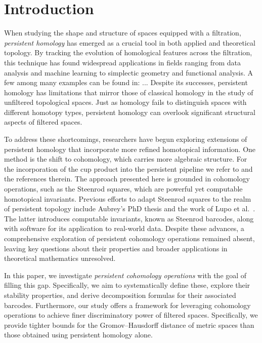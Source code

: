 
\section{Introduction} \label{s:introduction}

When studying the shape and structure of spaces equipped with a filtration, \textit{persistent homology} has emerged as a crucial tool in both applied and theoretical topology.
By tracking the evolution of homological features across the filtration, this technique has found widespread applications in fields ranging from data analysis and machine learning to simplectic geometry and functional analysis.
A few among many examples can be found in: ...
Despite its successes, persistent homology has limitations that mirror those of classical homology in the study of unfiltered topological spaces.
Just as homology fails to distinguish spaces with different homotopy types, persistent homology can overlook significant structural aspects of filtered spaces.

To address these shortcomings, researchers have begun exploring extensions of persistent homology that incorporate more refined homotopical information. One method is the shift to cohomology, which carries more algebraic structure.
For the incorporation of the cup product into the persistent pipeline we refer to \cite{memoli2024persistent} and the references therein.
The approach presented here is grounded in cohomology operations, such as the Steenrod squares, which are powerful yet computable homotopical invariants.
Previous efforts to adapt Steenrod squares to the realm of persistent topology include Aubrey's PhD thesis \cite{aubrey2011thesis} and the work of Lupo et al.\ \cite{medina2022per_st}.
The latter introduces computable invariants, known as Steenrod barcodes, along with software for its application to real-world data.
Despite these advances, a comprehensive exploration of persistent cohomology operations remained absent, leaving key questions about their properties and broader applications in theoretical mathematics unresolved.

In this paper, we investigate \textit{persistent cohomology operations} with the goal of filling this gap.
Specifically, we aim to systematically define these, explore their stability properties, and derive decomposition formulas for their associated barcodes.
Furthermore, our study offers a framework for leveraging cohomology operations to achieve finer discriminatory power of filtered spaces.
Specifically, we provide tighter bounds for the Gromov--Hausdorff distance of metric spaces than those obtained using persistent homology alone.


